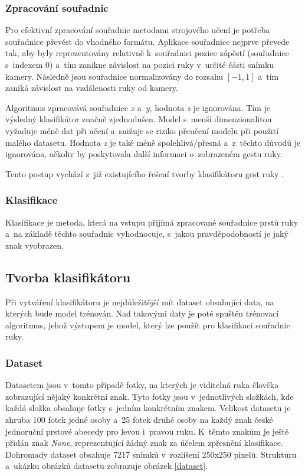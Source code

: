 \documentclass[
  master,
  program=ainfvs,
  biblatex,
  figures=true,
  tables=false,
  sourcecodes=true,
  glossaries,
  index
]{kidiplom}
\begin{document}
        \subsubsection{Zpracování souřadnic} \label{zpracovani-souradnic}
            Pro efektivní zpracování souřadnic metodami strojového učení je potřeba souřadnice převést do vhodného formátu. Aplikace souřadnice nejprve převede tak, aby byly reprezentovány relativně k~souřadnici pozice zápěstí (souřadnice s~indexem 0) a~tím zanikne závislost na pozici ruky v~určité části snímku kamery. Následně jsou souřadnice normalizovány do rozsahu $[-1, 1]$ a~tím zaniká závislost na vzdálenosti ruky od kamery. 

              Algoritmus zpracovává souřadnice \emph{x} a~\emph{y}, hodnota \emph{z} je ignorována. Tím je výsledný klasifikátor značně zjednodušen. Model s~menší dimenzionalitou vyžaduje méně dat při učení a~snižuje se riziko přeučení modelu při použití malého datasetu. Hodnota \emph{z} je také méně spolehlivá/přesná a~z~těchto důvodů je ignorována, ačkoliv by poskytovala další informaci o~zobrazeném gestu ruky. 
          
          Tento postup vychází z~již existujícího řešení tvorby klasifikátoru gest ruky \cite{mediapipe-example}.
           
        \subsubsection{Klasifikace}
            Klasifikace je metoda, která na vstupu přijímá zpracované souřadnice prstů ruky a~na základě těchto souřadnic vyhodnocuje, s~jakou pravděpodobností je jaký znak vyobrazen.
            
    
    \subsection{Tvorba klasifikátoru}
        Při vytváření klasifikátoru je nejdůležitější mít dataset obsahující data, na kterých bude model trénován. Nad takovými daty je poté spuštěn trénovací algoritmus, jehož výstupem je model, který lze použít pro klasifikaci souřadnic ruky.

        \subsubsection{Dataset}
            Datasetem jsou v~tomto případě fotky, na kterých je viditelná ruka člověka zobrazující nějaký konkrétní znak. Tyto fotky jsou v~jednotlivých složkách, kde každá složka obsahuje fotky s~jedním konkrétním znakem. Velikost datasetu je zhruba 100 fotek jedné osoby a~25 fotek druhé osoby na každý znak české jednoruční prstové abecedy pro levou i~pravou ruku. K~těmto znakům je ještě přidán znak \emph{None}, reprezentující žádný znak za účelem zpřesnění klasifikace. Dohromady dataset obsahuje 7217 snímků v~rozlišení 250x250 pixelů. Strukturu a~ukázku obrázků datasetu zobrazuje obrázek \ref{dataset}.
\end{document}
